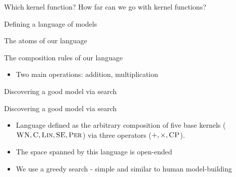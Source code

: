 \begin{frame}{Which kernel function?}
  How far can we go with kernel functions?
\end{frame}

\begin{frame}{Defining a language of models}
  
\end{frame}

\begin{frame}{The atoms of our language}  
  
\end{frame}

\begin{frame}{The composition rules of our language}
\begin{itemize} 
	\item Two main operations: addition, multiplication
\end{itemize}

\end{frame}



\begin{frame}{Discovering a good model via search}
  
\end{frame}

\begin{frame}{Discovering a good model via search}
  \begin{itemize}
    \item Language defined as the arbitrary composition of five base kernels (${\textsc{WN}}, {\textsc{C}}, {\textsc{Lin}}, {\textsc{SE}}, {\textsc{Per}}$) via three operators ($+, \times, {\textsc{CP}}$). 
    \vspace{\baselineskip}
    \item The space spanned by this language is open-ended
    \vspace{\baselineskip}
    \item We use a greedy search - simple and similar to human model-building
  \end{itemize}
\end{frame}

